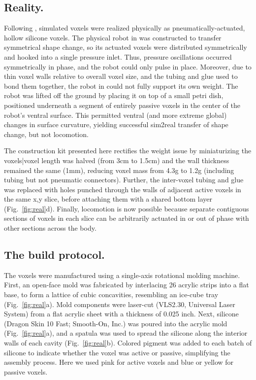 
\subsection{Reality.}


Following \citet{kriegman2019automated}, simulated voxels were realized physically as pneumatically-actuated, hollow silicone voxels.
The physical robot in \cite{kriegman2019automated} was constructed to transfer symmetrical shape change, so its actuated voxels were distributed symmetrically and hooked into a single pressure inlet.
Thus, pressure oscillations occurred symmetrically in phase, and the robot could only pulse in place.
Moreover, due to thin voxel walls relative to overall voxel size, and the tubing and glue used to bond them together, the robot in \cite{kriegman2019automated} could not fully support its own weight.
The robot was lifted off the ground by placing it on top of a small petri dish, positioned underneath a segment of entirely passive voxels in the center of the robot's ventral surface.
This permitted ventral (and more extreme global) changes in surface curvature, yielding successful sim2real transfer of shape change, 
but not locomotion.


The construction kit presented here rectifies the weight issue by miniaturizing the voxels|voxel length was halved (from 3cm to 1.5cm) and the wall thickness remained the same (1mm), reducing voxel mass from 4.3g to 1.2g (including tubing but not pneumatic connectors).
Further, the inter-voxel tubing and glue was replaced with holes punched through the walls of adjacent active voxels in the same x,y slice, before attaching them with a shared bottom layer (Fig.~\ref{fig:real}d).
Finally, locomotion is now possible because separate contiguous sections of voxels in each slice can be arbitrarily actuated in or out of phase with other sections across the body.


\subsection{The build protocol.}


The voxels were manufactured using a single-axis rotational molding machine.
First, an open-face mold was fabricated by interlacing 26 acrylic strips into a flat base, to form a lattice of cubic concavities, resembling an ice-cube tray (Fig.~\ref{fig:real}a). Mold components were laser-cut (VLS2.30, Universal Laser System) from a flat acrylic sheet with a thickness of 0.025 inch.
Next, silicone (Dragon Skin 10 Fast; Smooth-On, Inc.) was poured into the acrylic mold (Fig.~\ref{fig:real}a), and a spatula was used to spread the silicone along the interior walls of each cavity (Fig.~\ref{fig:real}b). Colored pigment was added to each batch of silicone to indicate whether the voxel was active or passive, simplifying the assembly process. Here we used pink for active voxels and blue or yellow for passive voxels.

